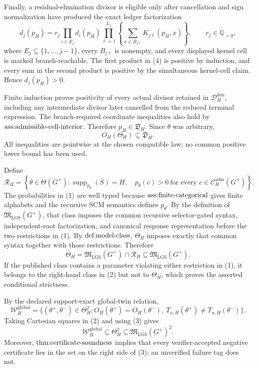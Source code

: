 Finally, a residual-elimination divisor is eligible only after cancellation and sign normalization have produced the exact ledger factorization
\[
 d_j(p_H)=r_j
 \prod_{i\in E_j}d_i(p_H)
 \prod_{\ell=1}^{L_j}
 \left\{\sum_{x\in B_{j\ell}}K_{j\ell}(p_H,x)\right\},
 \qquad r_j\in\mathbb Q_{>0},
\tag{4}
\]
where \(E_j\subseteq\{1,\ldots,j-1\}\), every \(B_{j\ell}\) is nonempty, and every displayed kernel cell is marked branch-reachable.  The first product in (4) is positive by induction, and every sum in the second product is positive by the simultaneous kernel-cell claim.  Hence \(d_j(p_H)>0\).

Finite induction proves positivity of every actual divisor retained in \(\mathcal D_H^{\mathrm{den}}\), including any intermediate divisor later cancelled from the reduced terminal expression.  The branch-required coordinate inequalities also hold by \(\textnormal{ass:admissible-cell-interior}\).  Therefore \(p_H\in\mathfrak D_H\).  Since \(\theta\) was arbitrary,
\[
 O_H(\Theta_H)\subseteq\mathfrak D_H.
\]
All inequalities are pointwise at the chosen compatible law; no common positive lower bound has been used.

Define
\[
 \mathcal R_H=
 \left\{\theta\in\Theta(G^+):
 \operatorname{supp}_{p_\theta}(S)=H,\quad
 p_\theta(c)>0\ \text{for every }c\in
 \mathcal C_H^{\mathrm{adm}}(G^+)\right\}.
\tag{1}
\]
The probabilities in (1) are well typed because \(\textnormal{ass:finite-categorical}\) gives finite alphabets and the recursive SCM semantics defines \(p_\theta\).  By the definition of \(\mathfrak M_{\mathrm{LGS}}(G^+)\), that class imposes the common recursive selector-gated syntax, independent-root factorization, and canonical response representation before the two restrictions in (1).  By \(\textnormal{def:model-class}\), \(\Theta_H\) imposes exactly that common syntax together with those restrictions.  Therefore
\[
 \Theta_H=\mathfrak M_{\mathrm{LGS}}(G^+)\cap\mathcal R_H
 \subseteq\mathfrak M_{\mathrm{LGS}}(G^+).
\tag{2}
\]
If the published class contains a parameter violating either restriction in (1), it belongs to the right-hand class in (2) but not to \(\Theta_H\), which proves the asserted conditional strictness.

By the declared support-exact global-twin relation,
\[
 \mathcal W_H^{\mathrm{global}}
 =\{(\theta^+,\theta^-)\in\Theta_H^2:
 O_H(\theta^+)=O_H(\theta^-),\ 
 T_{a,H}(\theta^+)\ne T_{a,H}(\theta^-)\}.
\tag{3}
\]
Taking Cartesian squares in (2) and using (3) gives
\[
 \mathcal W_H^{\mathrm{global}}
 \subseteq\Theta_H^2
 \subseteq\mathfrak M_{\mathrm{LGS}}(G^+)^2.
\tag{4}
\]
Moreover, \(\textnormal{thm:certificate-soundness}\) implies that every verifier-accepted negative certificate lies in the set on the right side of (3); an unverified failure tag does not.

